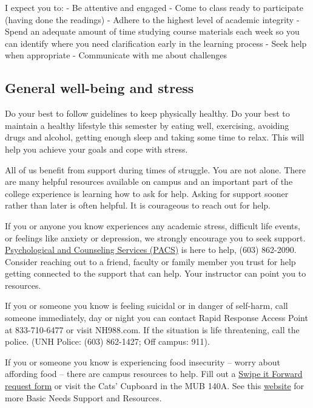 \documentclass[
  letterpaper,
  DIV=11,
  numbers=noendperiod]{scrreprt}
\begin{document}
I expect you to: - Be attentive and engaged - Come to class ready to
participate (having done the readings) - Adhere to the highest level of
academic integrity - Spend an adequate amount of time studying course
materials each week so you can identify where you need clarification
early in the learning process - Seek help when appropriate - Communicate
with me about challenges

\hypertarget{general-well-being-and-stress}{%
\subsection*{General well-being and
stress}\label{general-well-being-and-stress}}

Do your best to follow guidelines to keep physically healthy. Do your
best to maintain a healthy lifestyle this semester by eating well,
exercising, avoiding drugs and alcohol, getting enough sleep and taking
some time to relax. This will help you achieve your goals and cope with
stress.

All of us benefit from support during times of struggle. You are not
alone. There are many helpful resources available on campus and an
important part of the college experience is learning how to ask for
help. Asking for support sooner rather than later is often helpful. It
is courageous to reach out for help.

If you or anyone you know experiences any academic stress, difficult
life events, or feelings like anxiety or depression, we strongly
encourage you to seek support.
\href{https://www.unh.edu/pacs/}{Psychological and Counseling Services
(PACS)} is here to help, (603) 862-2090. Consider reaching out to a
friend, faculty or family member you trust for help getting connected to
the support that can help. Your instructor can point you to resources.

If you or someone you know is feeling suicidal or in danger of
self-harm, call someone immediately, day or night you can contact Rapid
Response Access Point at 833-710-6477 or visit NH988.com. If the
situation is life threatening, call the police. (UNH Police: (603)
862-1427; Off campus: 911).

If you or someone you know is experiencing food insecurity -- worry
about affording food -- there are campus resources to help. Fill out a
\href{https://cm.maxient.com/reportingform.php?UnivofNH\&layout_id=15}{Swipe
it Forward request form} or visit the Cats' Cupboard in the MUB 140A.
See this
\href{https://www.unh.edu/dean-of-students/getting-help/housing-food-financial-basic-needs-support}{website}
for more Basic Needs Support and Resources.
\end{document}
